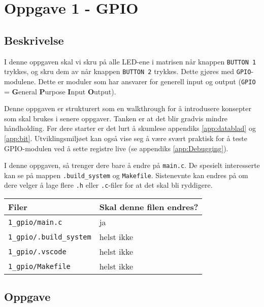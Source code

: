 \section{Oppgave 1 - GPIO}\label{sec:3-oppgave-GPIO}


\subsection{Beskrivelse}



I denne oppgaven skal vi skru på alle LED-ene i matrisen når knappen \verb|BUTTON 1| trykkes, og skru dem av når knappen \verb|BUTTON 2| trykkes. Dette gjøres med \verb|GPIO|-modulene. Dette er moduler som har ansvarer for generell input og output (\verb|GPIO| = \textbf{G}eneral \textbf{P}urpose \textbf{I}nput \textbf{O}utput).

Denne oppgaven er strukturert som en walkthrough for å introdusere konsepter som skal brukes i senere oppgaver. Tanken er at det blir gradvis mindre håndholding. Før dere starter er det lurt å skumlese appendiks \ref{app:datablad} og \ref{app:bit}. Utviklingsmiljøet kan også vise seg å være svært praktisk for å teste GPIO-modulen ved å sette registre live (se appendiks \ref{app:Debugging}).

I denne oppgaven, så trenger dere bare å endre på \verb|main.c|. De spesielt interesserte kan se på mappen \verb|.build_system| og \verb|Makefile|. Sistenevnte kan endres på om dere velger å lage flere \verb|.h| eller \verb|.c|-filer for at det skal bli ryddigere.

\begin{center}
 \begin{tabular}{|p{8.5cm} p{5.5cm}|} 
 \hline
 Filer & Skal denne filen endres?  \\ [0.5ex] 
 \hline\hline
 \verb|1_gpio/main.c| & \quad \quad \quad \quad ja  \\ 
 \hline
  \verb|1_gpio/.build_system| &  \quad \quad \quad \quad helst ikke \\ 
 \hline
 \verb|1_gpio/.vscode| &  \quad \quad \quad \quad helst ikke \\ 
 \hline
 \verb|1_gpio/Makefile| &  \quad \quad \quad \quad helst ikke \\ 
 \hline
\end{tabular}
\end{center}


\subsection{Oppgave}

